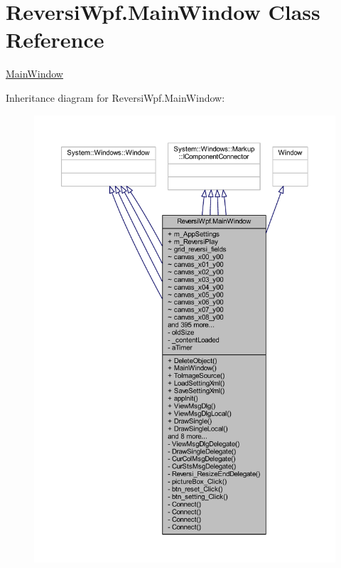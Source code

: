 \hypertarget{class_reversi_wpf_1_1_main_window}{}\section{Reversi\+Wpf.\+Main\+Window Class Reference}
\label{class_reversi_wpf_1_1_main_window}


\hyperlink{class_reversi_wpf_1_1_main_window}{Main\+Window}  




Inheritance diagram for Reversi\+Wpf.\+Main\+Window\+:
\nopagebreak
\begin{figure}[H]
\begin{center}
\leavevmode
\includegraphics[width=350pt]{class_reversi_wpf_1_1_main_window__inherit__graph}
\end{center}
\end{figure}


